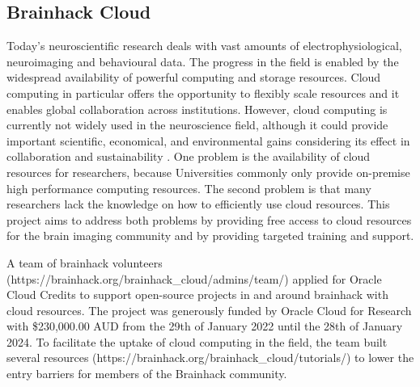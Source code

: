 \documentclass[../main.tex]{subfiles}
\begin{document}
\subsection{Brainhack Cloud}

%

Today’s neuroscientific research deals with vast amounts of electrophysiological, neuroimaging and behavioural data. The progress in the field is enabled by the widespread availability of powerful computing and storage resources. Cloud computing in particular offers the opportunity to flexibly scale resources and it enables global collaboration across institutions. However, cloud computing is currently not widely used in the neuroscience field, although it could provide important scientific, economical, and environmental gains considering its effect in collaboration and sustainability \parencite{apon2015, OracleSustainabilty}. One problem is the availability of cloud resources for researchers, because Universities commonly only provide on-premise high performance computing resources. The second problem is that many researchers lack the knowledge on how to efficiently use cloud resources. This project aims to address both problems by providing free access to cloud resources for the brain imaging community and by providing targeted training and support.

A team of brainhack volunteers (https://brainhack.org/brainhack\_cloud/admins/team/) applied for Oracle Cloud Credits to support open-source projects in and around brainhack with cloud resources. The project was generously funded by Oracle Cloud for Research \parencite{OracleResearch} with \$230,000.00 AUD from the 29th of January 2022 until the 28th of January 2024. To facilitate the uptake of cloud computing in the field, the team built several resources (https://brainhack.org/brainhack\_cloud/tutorials/) to lower the entry barriers for members of the Brainhack community. 
\end{document}
